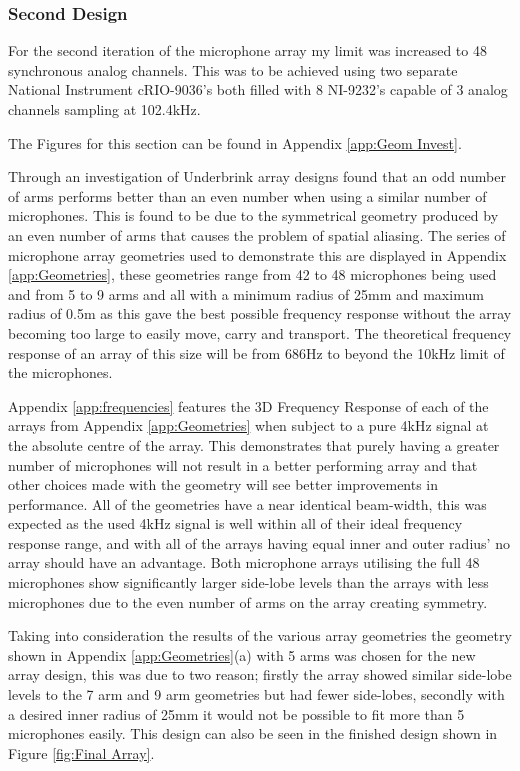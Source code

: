 \documentclass{UoNMCHA}
\numberwithin{equation}{section}
\begin{document}
\subsubsection{Second Design} \label{sec:Second Array Design}
    For the second iteration of the microphone array my limit was increased to 48 synchronous analog channels. This was to be achieved using two separate National Instrument cRIO-9036's both filled with 8 NI-9232's capable of 3 analog channels sampling at 102.4kHz.
    
    The Figures for this section can be found in Appendix \ref{app:Geom Invest}.
    
    Through an investigation of Underbrink array designs found that an odd number of arms performs better than an even number when using a similar number of microphones. This is found to be due to the symmetrical geometry produced by an even number of arms that causes the problem of spatial aliasing. The series of microphone array geometries used to demonstrate this are displayed in Appendix \ref{app:Geometries}, these geometries range from 42 to 48 microphones being used and from 5 to 9 arms and all with a minimum radius of 25mm and maximum radius of 0.5m as this gave the best possible frequency response without the array becoming too large to easily move, carry and transport. The theoretical frequency response of an array of this size will be from 686Hz to beyond the 10kHz limit of the microphones.
    
    Appendix \ref{app:frequencies} features the 3D Frequency Response of each of the arrays from Appendix \ref{app:Geometries} when subject to a pure 4kHz signal at the absolute centre of the array. This demonstrates that purely having a greater number of microphones will not result in a better performing array and that other choices made with the geometry will see better improvements in performance. All of the geometries have a near identical beam-width, this was expected as the used 4kHz signal is well within all of their ideal frequency response range, and with all of the arrays having equal inner and outer radius' no array should have an advantage. Both microphone arrays utilising the full 48 microphones show significantly larger side-lobe levels than the arrays with less microphones due to the even number of arms on the array creating symmetry.
    
    Taking into consideration the results of the various array geometries the geometry shown in Appendix \ref{app:Geometries}(a) with 5 arms was chosen for the new array design, this was due to two reason; firstly the array showed similar side-lobe levels to the 7 arm and 9 arm geometries but had fewer side-lobes, secondly with a desired inner radius of 25mm it would not be possible to fit more than 5 microphones easily. This design can also be seen in the finished design shown in Figure \ref{fig:Final Array}.
        
\end{document}
